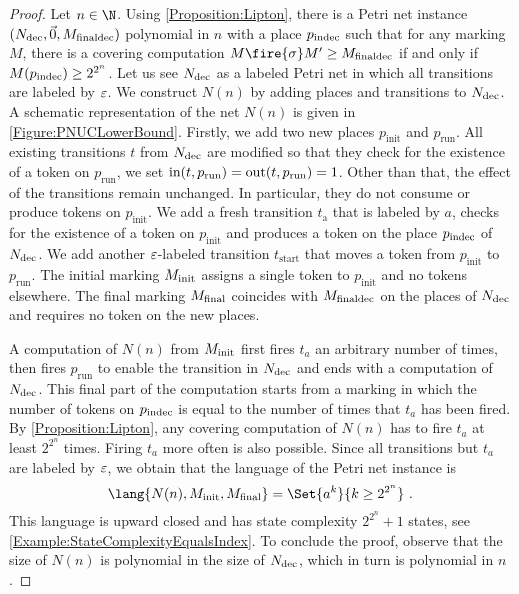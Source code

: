 \documentclass[../../diss.tex]{subfiles}
\begin{document}
\begin{proof}
    Let $n \in \N$.
    Using \cref{Proposition:Lipton}, there is a Petri net instance $(N_{\text{dec}},\vec{0},M_{{\text{final}}{\text{dec}}})$ polynomial in $n$ with a place $p_{\text{indec}}$ such that for any marking $M$, there is a covering computation $M \fire{\sigma} M' \geq \Mfinaldec$ if and only if $M(p_{\text{indec}}) \geq 2^{2^n}$.
    Let us see $N_{\text{dec}}$ as a labeled Petri net in which all transitions are labeled by $\varepsilon$.
    We construct $N(n)$ by adding places and transitions to $N_{\text{dec}}$.
    A schematic representation of the net $N(n)$ is given in \cref{Figure:PNUCLowerBound}.
    Firstly, we add two new places $p_{\text{init}}$ and $p_{\text{run}}$.
    All existing transitions $t$ from $N_{\text{dec}}$ are modified so that they check for the existence of a token on $p_{\text{run}}$, \ie we set $\text{in}(t,p_{\text{run}}) = \text{out}(t,p_{\text{run}}) = 1$.
    Other than that, the effect of the transitions remain unchanged.
    In particular, they do not consume or produce tokens on $p_{\text{init}}$.
    We add a fresh transition $t_{\text{a}}$ that is labeled by $a$, checks for the existence of a token on $p_{\text{init}}$ and produces a token on the place $p_{\text{indec}}$ of $N_{\text{dec}}$.
    We add another $\varepsilon$-labeled transition $t_{\text{start}}$ that moves a token from $p_{\text{init}}$ to $p_{\text{run}}$.
    The initial marking $M_{\text{init}}$ assigns a single token to $p_{\text{init}}$ and no tokens elsewhere.
    The final marking $M_{\text{final}}$ coincides with $M_{{\text{final}}{\text{dec}}}$ on the places of $N_{\text{dec}}$ and requires no token on the new places.

    A computation of $N(n)$ from $M_{\text{init}}$ first fires $t_{a}$ an arbitrary number of times, then fires $p_{\text{run}}$ to enable the transition in $N_{\text{dec}}$ and ends with a computation of $N_{\text{dec}}$.
    This final part of the computation starts from a marking in which the number of tokens on $p_{\text{indec}}$ is equal to the number of times that $t_{a}$ has been fired.
    By \cref{Proposition:Lipton}, any covering computation of $N(n)$ has to fire $t_{a}$ at least $2^{2^n}$ times.
    Firing $t_{a}$ more often is also possible.
    Since all transitions but $t_{a}$ are labeled by $\varepsilon$, we obtain that the language of the Petri net instance is
    \[
        \lang{N(n),\Minit,\Mfinal} = \Set{ a^k}{k \geq 2^{2^n}}
        \ .
    \]
    This language is upward closed and has state complexity $2^{2^n} + 1$ states, see \cref{Example:StateComplexityEqualsIndex}.
    To conclude the proof, observe that the size of $N(n)$ is polynomial in the size of $N_{\text{dec}}$, which in turn is polynomial in $n$.
\end{proof}
\end{document}
